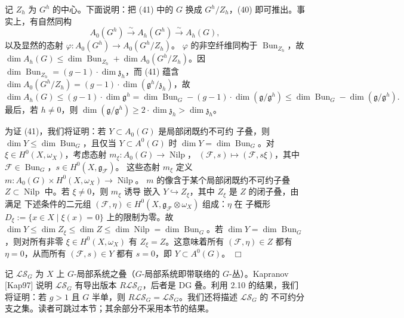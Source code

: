 记 $Z_h$ 为 $G^{h}$ 的中心。下面说明：把 (41) 中的 $G$ 换成
$G^{h}/Z_h$，(40) 即可推出。事实上，有自然同构
\[
  A_0(G^{h})\xrightarrow{\sim}A_h(G^{h})\xrightarrow{\sim}A_h(G),
\]
以及显然的态射 $\varphi:A_0(G^{h})\to A_0(G^{h}/Z_h)$。
$\varphi$ 的非空纤维同构于 $\operatorname{Bun}_{Z_h}$，故
$\dim A_h(G)\le\dim\operatorname{Bun}_{Z_h}
+\dim A_0(G^{h}/Z_h)$。因
$\dim\operatorname{Bun}_{Z_h}=(g-1)\cdot\dim\mathfrak{z}_h$，而
(41) 蕴含 $\dim A_0(G^{h}/Z_h)
=(g-1)\cdot\dim(\mathfrak{g}^{h}/\mathfrak{z}_h)$，故
\[
  \dim A_h(G)\le(g-1)\cdot\dim\mathfrak{g}^{h}
  =\dim\operatorname{Bun}_G
  -(g-1)\cdot\dim(\mathfrak{g}/\mathfrak{g}^{h})
  \le\dim\operatorname{Bun}_G-\dim(\mathfrak{g}/\mathfrak{g}^{h}).
\]
最后，若 $h\ne 0$，则 $\dim(\mathfrak{g}/\mathfrak{g}^{h})
\ge 2\cdot\dim\mathfrak{z}_h>\dim\mathfrak{z}_h$。

为证 (41)，我们将证明：若 $Y\subset A_0(G)$ 是局部闭既约不可约
子叠，则 $\dim Y\le\dim\operatorname{Bun}_G$，且仅当
$Y\subset A^{0}(G)$ 时 $\dim Y=\dim\operatorname{Bun}_G$。对
$\xi\in H^0(X,\omega_X)$，考虑态射
$m_\xi:A_0(G)\to\operatorname{Nilp}$，
$(\mathcal{F},s)\mapsto(\mathcal{F},s\xi)$，其中 $\mathcal{F}\in
\operatorname{Bun}_G$，$s\in H^0(X,\mathfrak{g}_{\mathcal{F}})$。
这些态射%
%
$m_\xi$ 定义 $m:A_0(G)\times H^0(X,\omega_X)\to\operatorname{Nilp}$。
$m$ 的像含于某个局部闭既约不可约子叠
$Z\subset\operatorname{Nilp}$ 中。若 $\xi\ne 0$，则 $m_\xi$ 诱导
嵌入 $Y\hookrightarrow Z_\xi$，其中 $Z_\xi$ 是 $Z$ 的闭子叠，由满足
下述条件的二元组 $(\mathcal{F},\eta)\in
H^0(X,\mathfrak{g}_{\mathcal{F}}\otimes\omega_X)$ 组成：$\eta$ 在
子概形 $D_\xi:=\{x\in X\mid\xi(x)=0\}$ 上的限制为零。故
$\dim Y\le\dim Z_\xi\le\dim Z\le\dim\operatorname{Nilp}
=\dim\operatorname{Bun}_G$。若
$\dim Y=\dim\operatorname{Bun}_G$，则对所有非零
$\xi\in H^0(X,\omega_X)$ 有 $Z_\xi=Z$。这意味着所有
$(\mathcal{F},\eta)\in Z$ 都有 $\eta=0$，从而所有
$(\mathcal{F},s)\in Y$ 都有 $s=0$，即 $Y\subset A^{0}(G)$。
\hfill$\Box$

 记 $\mathcal{LS}_G$ 为 $X$ 上
$G$-局部系统之叠（$G$-局部系统即带联络的 $G$-丛）。Kapranov
[Kap97] 说明 $\mathcal{LS}_G$ 有导出版本 $R\mathcal{LS}_G$，后者是
DG 叠。利用 2.10 的结果，我们将证明：若 $g>1$ 且 $G$ 半单，则
$R\mathcal{LS}_G=\mathcal{LS}_G$。我们还将描述 $\mathcal{LS}_G$ 的
不可约分支之集。读者可跳过本节；其余部分不采用本节的结果。


